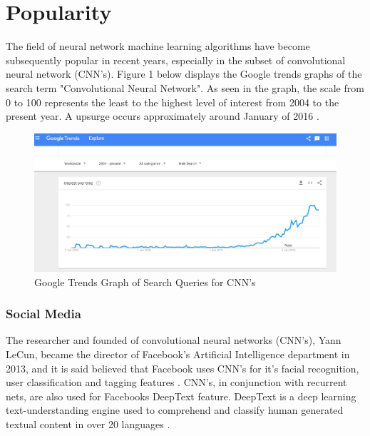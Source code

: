 
\section*{Popularity}
The field of neural network machine learning algorithms have become subsequently popular in recent years, 
especially in the subset of convolutional neural network (CNN's). Figure 1 below displays the Google trends
graphs of the search term "Convolutional Neural Network". As seen in the graph, the scale from 0 to 100
represents the least to the highest level of interest from 2004 to the present year. 
A upsurge occurs approximately around January of 2016 \citep{trends}.

\begin{figure}[ht]
\begin{center}
    \advance\leftskip-3cm
    \advance\rightskip-3cm
    \includegraphics[keepaspectratio=true,scale=0.6]{resources/cnn-trends.jpg}
    \caption{Google Trends Graph of Search Queries for CNN's}
    \label{pop}
\end{center}
\end{figure}


\subsubsection*{Social Media}
The researcher and founded of convolutional neural networks (CNN's), Yann LeCun, became the director of Facebook's Artificial Intelligence department in 2013, and it is said believed that Facebook uses CNN's for it's facial recognition, user classification and tagging features \citep{adit}. CNN's, in conjunction with recurrent nets, are also used for Facebooks DeepText feature. DeepText is a deep learning text-understanding engine used to comprehend and classify human generated textual content in over 20 languages \citep{DeepText}.

